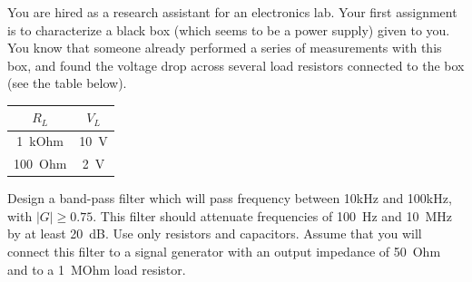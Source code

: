 \documentclass[letterpaper,addpoints,answers]{exam}
\begin{document}
\begin{questions}
\pagebreak

\question
You are hired as a research assistant for an electronics lab. Your first
assignment is to characterize a black box (which seems to be a power
supply) given to you.  
You know that someone already performed a series of measurements
with this box, and found the voltage drop across several load resistors
connected to the box (see the table below).

\begin{tabular}{|c|c|}
\hline$R_L$	  &  $V_L$ \\ 
\hline
1~kOhm	&  10~V \\
100~Ohm &  2~V \\
\hline
\end{tabular}


\question
Design a band-pass filter  which will pass frequency between 10kHz and
100kHz, with $|G| \ge  0.75$. This filter should attenuate frequencies of
100~Hz and 10~MHz by at least 20~dB. Use only resistors and capacitors.
Assume that you will connect this filter to a signal generator with
an output impedance of 50~Ohm and to a 1~MOhm load resistor.
\end{questions}
\end{document}
